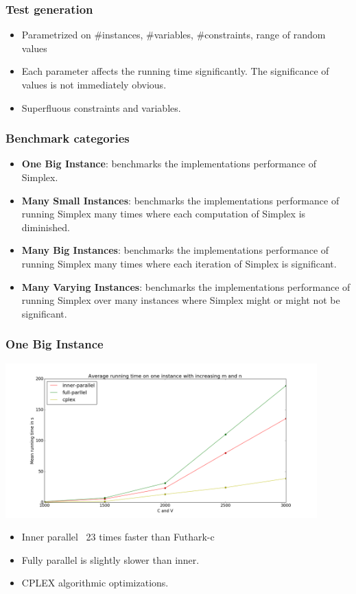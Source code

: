 \documentclass{beamer}
\begin{document}

\begin{frame}
	\frametitle{Test generation}
	\begin{itemize}
		\item Parametrized on \#instances, \#variables, \#constraints, range of random values
		
		\item Each parameter affects the running time significantly. The significance of values is not immediately obvious.
		
		\item Superfluous constraints and variables.
	\end{itemize}
\end{frame}

\begin{frame}
\frametitle{Benchmark categories}
\begin{itemize}
	\item \textbf{One Big Instance}: benchmarks the implementations performance of Simplex.
	
	\item \textbf{Many Small Instances}: benchmarks the implementations performance of running Simplex many times where each computation of Simplex is diminished.
	
	\item \textbf{Many Big Instances}: benchmarks the implementations performance of running Simplex many times where each iteration of Simplex is significant. 
	
	\item \textbf{Many Varying Instances}: benchmarks the implementations performance of running Simplex over many instances where Simplex might or might not be significant. 
\end{itemize}
\end{frame}

\begin{frame}[fragile]
\frametitle{One Big Instance}
\centering
\includegraphics[width=0.9\textwidth]{../Doc/figures/one-big-new}
\begin{itemize}
	\item Inner parallel ~23 times faster than Futhark-c
	\item Fully parallel is slightly slower than inner. 
	\item CPLEX algorithmic optimizations.
\end{itemize}
\end{frame}
\end{document}
